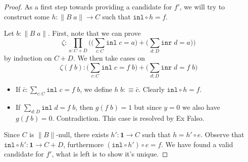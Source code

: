 \documentclass[12pt]{report}
\begin{document}
\begin{proof}
As a first step towards providing a candidate for $f'$, we will try to construct some $h : \lVert B\; a\rVert \rightarrow C$ such that $\mathtt{inl} \circ h = f$. 
\begin{center}
\end{center}
Let $b : \lVert B\; a\rVert$. 
First, note that we can prove 
$$\zeta : \prod_{a: C+D} \Big(\big(\sum_{c : C} \mathtt{inl}\; c = a\big) + \big( \sum_{d:D} \mathtt{inr}\; d = a \big) \Big)$$
by induction on $C+D$. 
We then take cases on 
$$\zeta (f\; b) : \big(\sum_{c : C} \mathtt{inl}\; c = f\; b\big) + \big( \sum_{d:D} \mathtt{inr}\; d = f\; b \big)$$
\begin{itemize}
	\item If $\bar{c} : \sum_{c : C} \mathtt{inl}\; c = f\; b$, we define $h\; b :\equiv \bar{c}$.
	Clearly $\mathtt{inl} \circ h = f$.
	\item If $\sum_{d : D} \mathtt{inl}\; d = f\; b$, then $g(f\;b) = 1$ but since $y=0$ we also have $g(f\;b) = 0$. Contradiction. 
	This case is resolved by Ex Falso.
\end{itemize}
Since $C$ is $\lVert B \rVert$-null, there exists $h' : \mathbf{1} \rightarrow C$ such that $h = h' \circ e$. 
Observe that $\mathtt{inl} \circ h' : \mathbf{1} \rightarrow C+D$, furthermore $(\mathtt{inl} \circ h') \circ e= f$. 
We have found a valid candidate for $f'$, what is left is to show it's unique. 


\end{proof}
\end{document}
